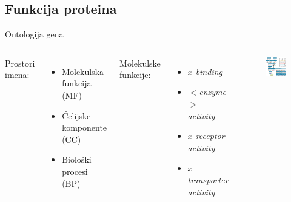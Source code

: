 \documentclass{beamer}
\begin{document}
\subsection{Funkcija proteina}

\begin{frame}{Ontologija gena}

  \begin{columns}

    Prostori imena:
    \begin{itemize}
      \footnotesize
      \item Molekulska funkcija (MF)
      \item Ćelijske komponente  (CC)
      \item Biološki procesi (BP)
    \end{itemize}


    Molekulske funkcije:
    \begin{itemize}
      \item \textit{$x$ binding} 
      \item \textit{$<$enzyme$>$ activity} 
      \item \textit{$x$ receptor activity} 
      \item \textit{$x$ transporter activity} 
    \end{itemize}


    \begin{figure}[h!]
      \vspace*{-0.7cm}
      \hspace*{-3.0cm} 
      \includegraphics[width=0.8\linewidth]{img/kinase.png}
    \end{figure}

  \end{columns}
  
\end{frame}
\end{document}
